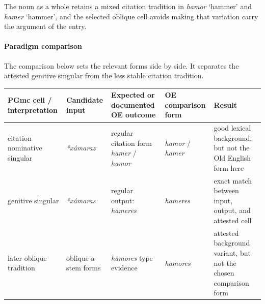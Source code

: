 \documentclass[
  british,
  a4paper,
]{article}
\newcounter{none} %
\begin{document}
The noun as a whole retains a mixed citation tradition in {\emph{hamor}}
`hammer' and {\emph{hamer}} `hammer', and the selected oblique cell
avoids making that variation carry the argument of the entry.

\paragraph{Paradigm comparison}\label{paradigm-comparison-6}

The comparison below sets the relevant forms side by side. It separates
the attested genitive singular from the less stable citation tradition.

{\def\LTcaptype{none} %
\begin{longtable}[]{@{}
  >{\raggedright\arraybackslash}p{}
  >{\raggedright\arraybackslash}p{}
  >{\raggedright\arraybackslash}p{}
  >{\raggedright\arraybackslash}p{}
  >{\raggedright\arraybackslash}p{}@{}}
\toprule\noalign{}
\begin{minipage}[b]{\linewidth}\raggedright
PGmc cell / interpretation
\end{minipage} & \begin{minipage}[b]{\linewidth}\raggedright
Candidate input
\end{minipage} & \begin{minipage}[b]{\linewidth}\raggedright
Expected or documented OE outcome
\end{minipage} & \begin{minipage}[b]{\linewidth}\raggedright
OE comparison form
\end{minipage} & \begin{minipage}[b]{\linewidth}\raggedright
Result
\end{minipage} \\
\midrule\noalign{}
\endhead
\bottomrule\noalign{}
\endlastfoot
citation nominative singular & {\emph{*xámaraz}} & regular citation form
{\emph{hamer}} / {\emph{hamor}} & {\emph{hamor}} / {\emph{hamer}} & good
lexical background, but not the Old English form here \\
genitive singular & {\emph{*xámaras}} & regular output: {\emph{hameres}}
& {\emph{hameres}} & exact match between input, output, and attested
cell \\
later oblique tradition & oblique a-stem forms & {\emph{hamores}} type
evidence & {\emph{hamores}} & attested background variant, but not the
chosen comparison form \\
\end{longtable}
}
\end{document}
